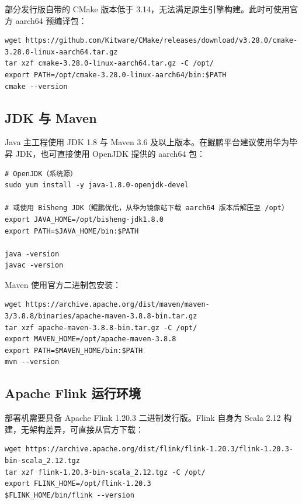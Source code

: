 \documentclass[a4paper,11pt]{article}
\begin{document}
部分发行版自带的 CMake 版本低于 3.14，无法满足原生引擎构建。此时可使用官方 aarch64 预编译包：

\begin{lstlisting}[language=shellcmd]
wget https://github.com/Kitware/CMake/releases/download/v3.28.0/cmake-3.28.0-linux-aarch64.tar.gz
tar xzf cmake-3.28.0-linux-aarch64.tar.gz -C /opt/
export PATH=/opt/cmake-3.28.0-linux-aarch64/bin:$PATH
cmake --version
\end{lstlisting}

\subsection{JDK 与 Maven}

Java 主工程使用 JDK 1.8 与 Maven 3.6 及以上版本。在鲲鹏平台建议使用华为毕昇 JDK，也可直接使用 OpenJDK 提供的 aarch64 包：

\begin{lstlisting}[language=shellcmd]
# OpenJDK（系统源）
sudo yum install -y java-1.8.0-openjdk-devel

# 或使用 BiSheng JDK（鲲鹏优化，从华为镜像站下载 aarch64 版本后解压至 /opt）
export JAVA_HOME=/opt/bisheng-jdk1.8.0
export PATH=$JAVA_HOME/bin:$PATH

java -version
javac -version
\end{lstlisting}

Maven 使用官方二进制包安装：

\begin{lstlisting}[language=shellcmd]
wget https://archive.apache.org/dist/maven/maven-3/3.8.8/binaries/apache-maven-3.8.8-bin.tar.gz
tar xzf apache-maven-3.8.8-bin.tar.gz -C /opt/
export MAVEN_HOME=/opt/apache-maven-3.8.8
export PATH=$MAVEN_HOME/bin:$PATH
mvn --version
\end{lstlisting}

\subsection{Apache Flink 运行环境}

部署机需要具备 Apache Flink 1.20.3 二进制发行版。Flink 自身为 Scala 2.12 构建，无架构差异，可直接从官方下载：

\begin{lstlisting}[language=shellcmd]
wget https://archive.apache.org/dist/flink/flink-1.20.3/flink-1.20.3-bin-scala_2.12.tgz
tar xzf flink-1.20.3-bin-scala_2.12.tgz -C /opt/
export FLINK_HOME=/opt/flink-1.20.3
$FLINK_HOME/bin/flink --version
\end{lstlisting}
\end{document}
